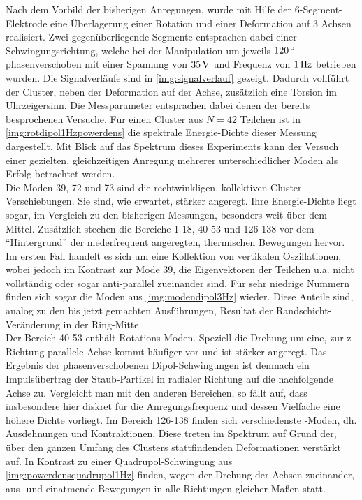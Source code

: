             Nach dem Vorbild der bisherigen Anregungen, wurde mit Hilfe der 6-Segment-Elektrode eine Überlagerung einer Rotation und einer Deformation auf 3 Achsen realisiert. Zwei gegenüberliegende Segmente entsprachen dabei einer Schwingungsrichtung, welche bei der Manipulation um jeweils $\unit[120]{\degree}$ phasenverschoben mit einer Spannung von $\unit[35]{V}$  und Frequenz von $\unit[1]{Hz}$ betrieben wurden. Die Signalverläufe sind in \autoref{img:signalverlauf} gezeigt. Dadurch vollführt der Cluster, neben der Deformation auf der Achse, zusätzlich eine Torsion im Uhrzeigersinn. Die Messparameter entsprachen dabei denen der bereits besprochenen Versuche. Für einen Cluster aus $N=42$ Teilchen ist in \autoref{img:rotdipol1Hzpowerdens} die spektrale Energie-Dichte dieser Messung dargestellt. Mit Blick auf das Spektrum dieses Experiments kann der Versuch einer gezielten, gleichzeitigen Anregung mehrerer unterschiedlicher Moden als Erfolg betrachtet werden.\\
            Die Moden 39, 72 und 73 sind die rechtwinkligen, kollektiven Cluster-Verschiebungen. Sie sind, wie erwartet, stärker angeregt. Ihre Energie-Dichte liegt sogar, im Vergleich zu den bisherigen Messungen, besonders weit über dem Mittel. Zusätzlich stechen die Bereiche 1-18, 40-53 und 126-138 vor dem "`Hintergrund"' der niederfrequent angeregten, thermischen Bewegungen hervor. Im ersten Fall handelt es sich um eine Kollektion von vertikalen Oszillationen, wobei jedoch im Kontrast zur Mode 39, die Eigenvektoren der Teilchen u.a. nicht vollständig oder sogar anti-parallel zueinander sind. Für sehr niedrige Nummern finden sich sogar die Moden aus \autoref{img:modendipol3Hz} wieder. Diese Anteile sind, analog zu den bis jetzt gemachten Ausführungen, Resultat der Randschicht-Veränderung in der Ring-Mitte.\\
            Der Bereich 40-53 enthält Rotations-Moden. Speziell die Drehung um eine, zur z-Richtung parallele Achse kommt häufiger vor und ist stärker angeregt. Das Ergebnis der phasenverschobenen Dipol-Schwingungen ist demnach ein Impulsübertrag der Staub-Partikel in radialer Richtung auf die nachfolgende Achse zu. Vergleicht man mit den anderen Bereichen, so fällt auf, dass insbesondere hier diskret für die Anregungsfrequenz und dessen Vielfache eine höhere Dichte vorliegt. Im Bereich 126-138 finden sich verschiedenste -Moden, dh. Ausdehnungen und Kontraktionen. Diese treten im Spektrum auf Grund der, über den ganzen Umfang des Clusters stattfindenden Deformationen verstärkt auf. In Kontrast zu einer Quadrupol-Schwingung aus \autoref{img:powerdensquadrupol1Hz} finden, wegen der Drehung der Achsen zueinander, aus- und einatmende Bewegungen in alle Richtungen gleicher Maßen statt.

